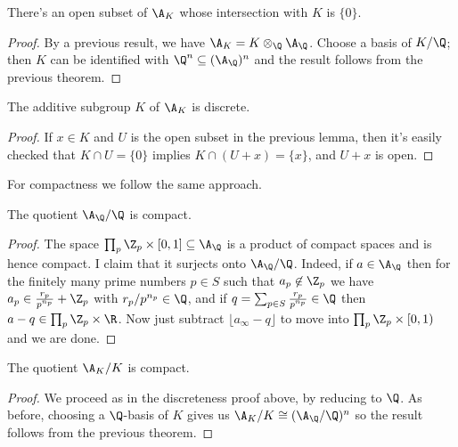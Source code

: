 \begin{theorem}
  \label{NumberField.AdeleRing.zero_discrete}
  \leanok
  There's an open subset of $\A_{K}$ whose intersection with $K$ is $\{0\}$.
\end{theorem}
\begin{proof}
  By a previous result, we have $\A_K=K\otimes_{\Q}\A_{\Q}$.
  Choose a basis of $K/\Q$; then $K$ can be identified with $\Q^n\subseteq(\A_{\Q})^n$
  and the result follows from the previous theorem.
\end{proof}

\begin{theorem}
  \label{NumberField.AdeleRing.discrete}
  \leanok
  The additive subgroup $K$ of $\A_K$ is discrete.
\end{theorem}
\begin{proof}
  If $x\in K$ and $U$ is the open subset in the previous lemma, then
  it's easily checked that $K\cap U=\{0\}$ implies $K\cap (U+x)=\{x\}$,
  and $U+x$ is open.
\end{proof}

For compactness we follow the same approach.

\begin{theorem}
  \label{Rat.AdeleRing.cocompact}
  \leanok
  The quotient $\A_{\Q}/\Q$ is compact.
\end{theorem}
\begin{proof}
  The space $\prod_p\Z_p\times[0,1]\subseteq\A_{\Q}$ is a product of compact spaces
  and is hence compact. I claim that it surjects onto $\A_{\Q}/\Q$. Indeed,
  if $a\in\A_{\Q}$ then for the finitely many prime numbers $p\in S$ such that $a_p\not\in\Z_p$
  we have $a_p\in\frac{r_p}{p^{n_p}}+\Z_p$ with $r_p/p^{n_p}\in\Q$, and
  if $q=\sum_{p\in S}\frac{r_p}{p^{n_p}}\in\Q$ then $a-q\in \prod_p\Z_p\times\R$.
  Now just subtract $\lfloor a_{\infty}-q\rfloor$ to move into $\prod_p\Z_p\times[0,1)$
  and we are done.
\end{proof}

\begin{theorem}
  \label{NumberField.AdeleRing.cocompact}
  \leanok
  The quotient $\A_K/K$ is compact.
\end{theorem}
\begin{proof}
  We proceed as in the discreteness proof above, by reducing to $\Q$. As before, choosing
  a $\Q$-basis of $K$ gives us $\A_K/K\cong(\A_{\Q}/\Q)^n$ so the result follows from
  the previous theorem.
\end{proof}
